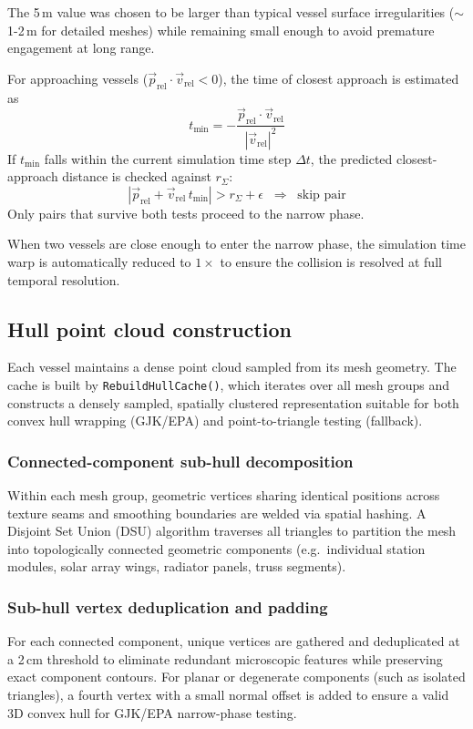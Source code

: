 \documentclass[Orbiter Technical Reference.tex]{subfiles}
\begin{document}
The 5\,m value was chosen to be larger than typical vessel surface
irregularities ($\sim$1-2\,m for detailed meshes) while remaining small
enough to avoid premature engagement at long range.

For approaching vessels ($\vec{p}_{\mathrm{rel}} \cdot \vec{v}_{\mathrm{rel}} < 0$),
the time of closest approach is estimated as
\begin{equation*}
t_{\mathrm{min}} = -\frac{\vec{p}_{\mathrm{rel}} \cdot \vec{v}_{\mathrm{rel}}}
                         {|\vec{v}_{\mathrm{rel}}|^2}
\end{equation*}
If $t_{\mathrm{min}}$ falls within the current simulation time step $\Delta t$,
the predicted closest-approach distance is checked against $r_{\Sigma}$:
\begin{equation*}
|\vec{p}_{\mathrm{rel}} + \vec{v}_{\mathrm{rel}}\,t_{\mathrm{min}}|
> r_{\Sigma} + \epsilon
\;\;\Rightarrow\;\; \text{skip pair}
\end{equation*}
Only pairs that survive both tests proceed to the narrow phase.

When two vessels are close enough to enter the narrow phase, the
simulation time warp is automatically reduced to $1\times$ to ensure
the collision is resolved at full temporal resolution.


\subsection{Hull point cloud construction}
\label{ssec:hullcloud}
Each vessel maintains a dense point cloud sampled from its mesh
geometry.  The cache is built by \texttt{RebuildHullCache()}, which
iterates over all mesh groups and constructs a densely sampled,
spatially clustered representation suitable for both convex hull
wrapping (GJK/EPA) and point-to-triangle testing (fallback).

\subsubsection{Connected-component sub-hull decomposition}
Within each mesh group, geometric vertices sharing identical positions across
texture seams and smoothing boundaries are welded via spatial hashing.
A Disjoint Set Union (DSU) algorithm traverses all triangles to partition the
mesh into topologically connected geometric components (e.g.\ individual station
modules, solar array wings, radiator panels, truss segments).

\subsubsection{Sub-hull vertex deduplication and padding}
For each connected component, unique vertices are gathered and deduplicated
at a 2\,cm threshold to eliminate redundant microscopic features while preserving
exact component contours.  For planar or degenerate components (such as isolated
triangles), a fourth vertex with a small normal offset is added to ensure a
valid 3D convex hull for GJK/EPA narrow-phase testing.
\end{document}
